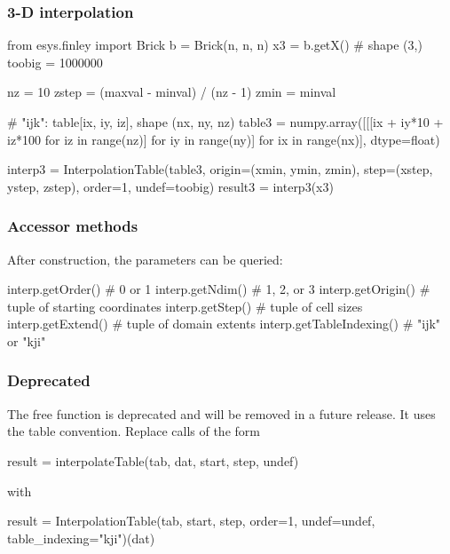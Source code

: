 \subsubsection{3-D interpolation}

\begin{python}
from esys.finley import Brick
b = Brick(n, n, n)
x3 = b.getX()   # shape (3,)
toobig = 1000000

nz = 10
zstep = (maxval - minval) / (nz - 1)
zmin = minval

# "ijk": table[ix, iy, iz], shape (nx, ny, nz)
table3 = numpy.array([[[ix + iy*10 + iz*100 for iz in range(nz)]
                        for iy in range(ny)]
                       for ix in range(nx)], dtype=float)

interp3 = InterpolationTable(table3, origin=(xmin, ymin, zmin),
                             step=(xstep, ystep, zstep),
                             order=1, undef=toobig)
result3 = interp3(x3)
\end{python}

\subsubsection{Accessor methods}

After construction, the parameters can be queried:

\begin{python}
interp.getOrder()          # 0 or 1
interp.getNdim()           # 1, 2, or 3
interp.getOrigin()         # tuple of starting coordinates
interp.getStep()           # tuple of cell sizes
interp.getExtend()         # tuple of domain extents
interp.getTableIndexing()  # "ijk" or "kji"
\end{python}

\subsubsection{Deprecated }

The free function  is deprecated and will be
removed in a future release.  It uses the  table convention.
Replace calls of the form
\begin{python}
result = interpolateTable(tab, dat, start, step, undef)
\end{python}
with
\begin{python}
result = InterpolationTable(tab, start, step, order=1, undef=undef,
                            table_indexing="kji")(dat)
\end{python}


